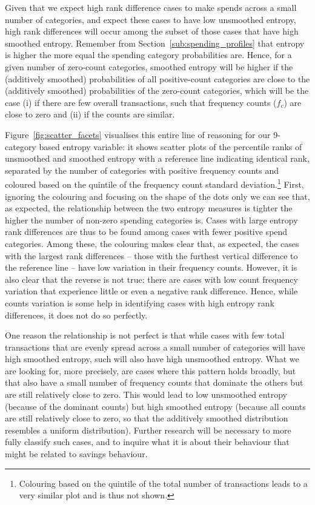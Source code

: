 Given that we expect high rank difference cases to make spends across a small
number of categories, and expect these cases to have low unsmoothed entropy,
high rank differences will occur among the subset of those cases that have high
smoothed entropy. Remember from Section~\ref{sub:spending_profiles} that
entropy is higher the more equal the spending category probabilities are.
Hence, for a given number of zero-count categories, smoothed entropy will be
higher if the (additively smoothed) probabilities of all positive-count
categories are close to the (additively smoothed) probabilities of the
zero-count categories, which will be the case (i) if there are few overall
transactions, such that frequency counts ($f_c$) are close to zero and (ii) if
the counts are similar.

Figure~\ref{fig:scatter_facets} visualises this entire line of reasoning for
our 9-category based entropy variable: it shows scatter plots of the percentile
ranks of unsmoothed and smoothed entropy with a reference line indicating
identical rank, separated by the number of categories with positive frequency
counts and coloured based on the quintile of the frequency count standard
deviation.\footnote{Colouring based on the quintile of the total number of
transactions leads to a very similar plot and is thus not shown.} First,
ignoring the colouring and focusing on the shape of the dots only we can see
that, as expected, the relationship between the two entropy measures is tighter
the higher the number of non-zero spending categories is. Cases with large
entropy rank differences are thus to be found among cases with fewer positive
spend categories. Among these, the colouring makes clear that, as expected, the
cases with the largest rank differences -- those with the furthest vertical
difference to the reference line -- have low variation in their frequency
counts. However, it is also clear that the reverse is not true: there are cases
with low count frequency variation that experience little or even a negative
rank difference. Hence, while counts variation is some help in identifying
cases with high entropy rank differences, it does not do so perfectly.

One reason the relationship is not perfect is that while cases with few total
transactions that are evenly spread across a small number of categories will
have high smoothed entropy, such will also have high unsmoothed entropy. What
we are looking for, more precisely, are cases where this pattern holds broadly,
but that also have a small number of frequency counts that dominate the others
but are still relatively close to zero. This would lead to low unsmoothed
entropy (because of the dominant counts) but high smoothed entropy (because all
counts are still relatively close to zero, so that the additively smoothed
distribution resembles a uniform distribution). Further research will be
necessary to more fully classify such cases, and to inquire what it is about
their behaviour that might be related to savings behaviour.


